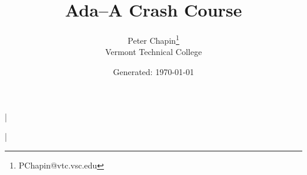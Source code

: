 \documentclass{report}
\begin{document}
\title{Ada--A Crash Course}
\author{Peter Chapin\thanks{PChapin@vtc.vsc.edu}\\
  Vermont Technical College}
\date{Generated: \today}
\maketitle

\lstMakeShortInline|

%





\lstDeleteShortInline|

%
%
%
%
%



\end{document}
